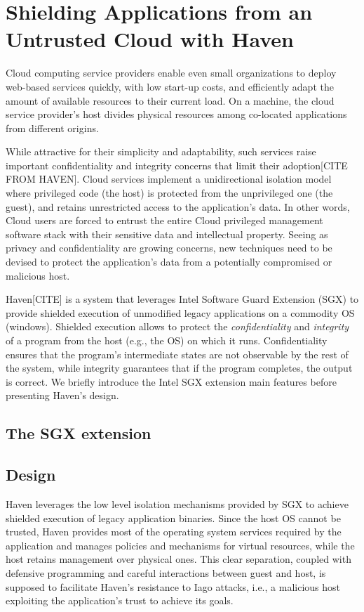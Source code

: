 \section{Shielding Applications from an Untrusted Cloud with Haven}

Cloud computing service providers enable even small organizations to deploy web-based services quickly, with low start-up costs, and efficiently adapt the amount of available resources to their current load.
On a machine, the cloud service provider's host divides physical resources among co-located applications from different origins.

While attractive for their simplicity and adaptability, such services raise important confidentiality and integrity concerns that limit their adoption[CITE FROM HAVEN].
Cloud services implement a unidirectional isolation model where privileged code (the host) is protected from the unprivileged one (the guest), and retains unrestricted access to the application's data.
In other words, Cloud users are forced to entrust the entire Cloud privileged management software stack with their sensitive data and intellectual property.
Seeing as privacy and confidentiality are growing concerns, new techniques need to be devised to protect the application's data from a potentially compromised or malicious host.

Haven[CITE] is a system that leverages Intel Software Guard Extension (SGX) to provide shielded execution of unmodified legacy applications on a commodity OS (windows).
Shielded execution allows to protect the \emph{confidentiality} and \emph{integrity} of a program from the host (e.g., the OS) on which it runs.
Confidentiality ensures that the program's intermediate states are not observable by the rest of the system, while integrity guarantees that if the program completes, the output is correct.
We briefly introduce the Intel SGX extension main features before presenting Haven's design.

\subsection{The SGX extension}



\subsection{Design}

Haven leverages the low level isolation mechanisms provided by SGX to achieve shielded execution of legacy application binaries.
Since the host OS cannot be trusted, Haven provides most of the operating system services required by the application and manages policies and mechanisms for virtual resources, while the host retains management over physical ones.
This clear separation, coupled with defensive programming and careful interactions between guest and host, is supposed to facilitate Haven's resistance to Iago attacks, i.e., a malicious host exploiting the application's trust to achieve its goals.

